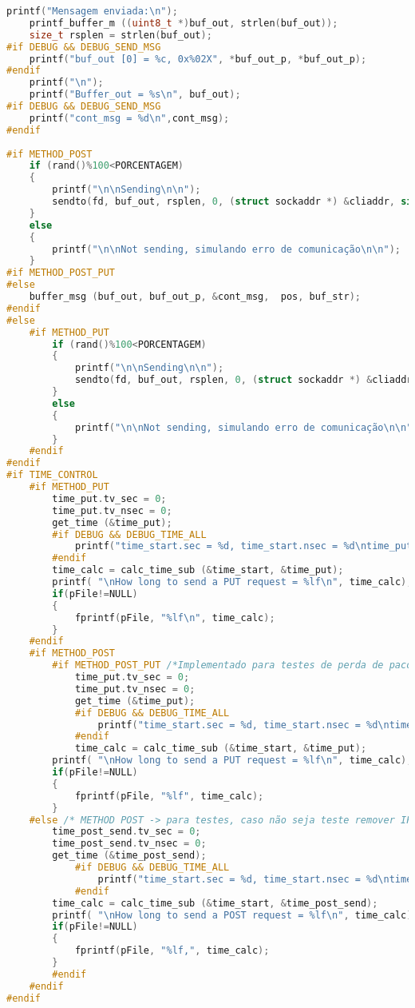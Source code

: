 \begin{lstlisting}[language=C++]
	printf("Mensagem enviada:\n");
	printf_buffer_m ((uint8_t *)buf_out, strlen(buf_out));
	size_t rsplen = strlen(buf_out);
#if DEBUG && DEBUG_SEND_MSG
	printf("buf_out [0] = %c, 0x%02X", *buf_out_p, *buf_out_p);
#endif
	printf("\n");
	printf("Buffer_out = %s\n", buf_out);
#if DEBUG && DEBUG_SEND_MSG
	printf("cont_msg = %d\n",cont_msg);
#endif
	
#if METHOD_POST
	if (rand()%100<PORCENTAGEM)
	{
		printf("\n\nSending\n\n");
		sendto(fd, buf_out, rsplen, 0, (struct sockaddr *) &cliaddr, sizeof(cliaddr));
	}
	else
	{
		printf("\n\nNot sending, simulando erro de comunicação\n\n");
	}
#if METHOD_POST_PUT
#else
	buffer_msg (buf_out, buf_out_p, &cont_msg,  pos, buf_str);
#endif
#else
	#if METHOD_PUT
		if (rand()%100<PORCENTAGEM)
		{
			printf("\n\nSending\n\n");
			sendto(fd, buf_out, rsplen, 0, (struct sockaddr *) &cliaddr, sizeof(cliaddr));
		}
		else
		{
			printf("\n\nNot sending, simulando erro de comunicação\n\n");
		}	
	#endif
#endif
#if TIME_CONTROL
	#if METHOD_PUT
		time_put.tv_sec = 0;
		time_put.tv_nsec = 0;				   		
		get_time (&time_put);
		#if DEBUG && DEBUG_TIME_ALL
			printf("time_start.sec = %d, time_start.nsec = %d\ntime_put.sec = %d, time_put.nsec = %d", (int)time_start.tv_sec, (int)time_start.tv_nsec, (int)time_put.tv_sec, (int)time_put.tv_nsec);
		#endif
		time_calc = calc_time_sub (&time_start, &time_put);
		printf( "\nHow long to send a PUT request = %lf\n", time_calc);
		if(pFile!=NULL)
		{
			fprintf(pFile, "%lf\n", time_calc);
		}
	#endif
	#if METHOD_POST
		#if METHOD_POST_PUT /*Implementado para testes de perda de pacote*/
			time_put.tv_sec = 0;
			time_put.tv_nsec = 0;				   		
			get_time (&time_put);
			#if DEBUG && DEBUG_TIME_ALL
				printf("time_start.sec = %d, time_start.nsec = %d\ntime_put.sec = %d, time_put.nsec = %d", (int)time_start.tv_sec, (int)time_start.tv_nsec, (int)time_put.tv_sec, (int)time_put.tv_nsec);
			#endif
			time_calc = calc_time_sub (&time_start, &time_put);
		printf( "\nHow long to send a PUT request = %lf\n", time_calc);
		if(pFile!=NULL)
		{
			fprintf(pFile, "%lf", time_calc);
		}
	#else /* METHOD POST -> para testes, caso não seja teste remover IF*/
		time_post_send.tv_sec = 0;
		time_post_send.tv_nsec = 0;				   		
		get_time (&time_post_send);
			#if DEBUG && DEBUG_TIME_ALL
				printf("time_start.sec = %d, time_start.nsec = %d\ntime_post.sec = %d, time_post.nsec = %d", (int)time_start.tv_sec, (int)time_start.tv_nsec, (int)time_post_send.tv_sec, (int)time_post_send.tv_nsec);
			#endif
		time_calc = calc_time_sub (&time_start, &time_post_send);
		printf( "\nHow long to send a POST request = %lf\n", time_calc);
		if(pFile!=NULL)
		{
			fprintf(pFile, "%lf,", time_calc);
		}
		#endif	
	#endif
#endif
	

\end{lstlisting}
